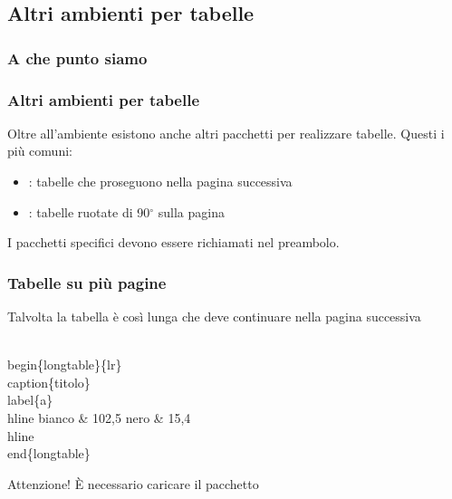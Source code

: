 \subsection{Altri ambienti per tabelle}
\begin{frame}
  \frametitle{A che punto siamo}
\end{frame}
\begin{frame}
  \frametitle{Altri ambienti per tabelle}
	Oltre all'ambiente  esistono anche altri pacchetti per realizzare tabelle. Questi i pi\`u comuni:
	\begin{itemize}
		\item {}: tabelle che proseguono nella pagina successiva
		\item {}: tabelle ruotate di 90$^{\circ}$ sulla pagina
	\end{itemize}
	I pacchetti specifici devono essere richiamati nel preambolo.
\end{frame}
\begin{frame}
  \frametitle{Tabelle su pi\`u pagine}
	Talvolta la tabella \`e cos\`i lunga che deve continuare nella pagina successiva
	\begin{LaTeXcode}
		\alert{\\begin\{longtable\}\{lr\}}\n
		\\caption\{titolo\}\\label\{a\}\
		\\hline\n
		\hspace*{5ex}bianco \& 102,5 \bs\bs\n
		\hspace*{5ex}nero   \& 15,4 \bs\bs\
		\\hline\n
		\alert{\\end\{longtable\}}
	\end{LaTeXcode}
	\begin{block}{Attenzione!}
		\`E necessario caricare il pacchetto 
	\end{block}
\end{frame}
